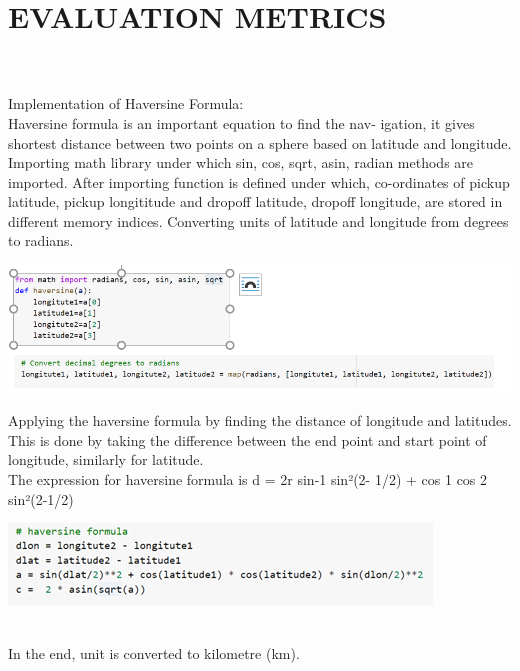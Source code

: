 \documentclass[journal,twoside,web]{ieeecolor}
\begin{document}
\section{EVALUATION METRICS}
\label{EVALUATION METRICS}
\\
\\
Implementation of Haversine Formula:
\\
Haversine formula is an important equation to find the nav- igation, it gives shortest distance between two points on a sphere based on latitude and longitude. Importing math library under which sin, cos, sqrt, asin, radian methods are imported. After importing function is defined under which, co-ordinates of pickup latitude, pickup longititude and dropoff latitude, dropoff longitude, are stored in different memory indices. Converting units of latitude and longitude from degrees to radians.
\begin{center}
\includegraphics[scale=0.60]{Picture13.png}
\end{center}
Applying the haversine formula by finding the distance of longitude and latitudes. This is done by taking the difference between the end point and start point of longitude, similarly for latitude.
\\
The expression for haversine formula is d = 2r sin-1 sin²(2- 1/2) + cos 1 cos 2 sin²(2-1/2)
\begin{center}
\includegraphics[scale=0.60]{Picture14.png}
\end{center}
\\
In the end, unit is converted to kilometre (km).
\\
\end{document}
